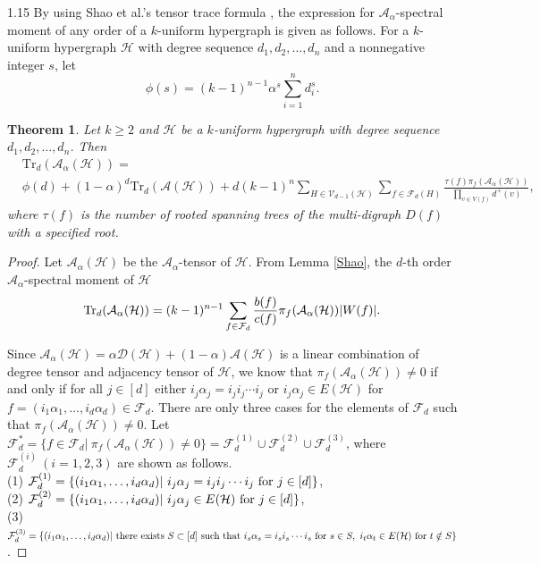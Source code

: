 \documentclass[preprint,12pt]{elsarticle1}
\newtheorem{thm}{Theorem}[section]
\numberwithin{equation}{section}
\begin{document}
\begin{spacing}{1.15}
By using Shao et al.'s tensor trace formula \cite{ref8}, the expression for $\mathcal{A}_{\alpha}$-spectral moment of any order of a $k$-uniform hypergraph is given as follows.
For a $k$-uniform hypergraph $\mathcal{H}$ with degree sequence $d_1,d_2,\ldots,d_n$ and a nonnegative integer $s$, let $$\phi(s)=(k-1)^{n-1}\alpha^{s}\sum_{i=1}^{n}d_{i}^{s}.$$

\begin{thm}\label{T}
Let $k\ge2$ and $\mathcal{H}$ be a $k$-uniform hypergraph with degree sequence $d_1,d_2,\ldots,d_n$.
Then
\begin{equation*}
\begin{aligned}
&\mathrm{Tr}_{d}(\mathcal{A}_{\alpha}(\mathcal{H}))=\\& \phi(d)+(1-\alpha)^{d}\mathrm{Tr}_{d}(\mathcal{A}(\mathcal{H}))+d(k-1)^{n}\sum\limits_{H\in\mathcal{V}_{d-1}(\mathcal{H})}\sum\limits_{f\in\mathcal{F}_{d}(H)}\frac{\tau(f)\pi_{f}(\mathcal{A}_{\alpha}(\mathcal{H}))}{\prod\limits_{v\in V(f)}d^{+}(v)},
\end{aligned}
\end{equation*}
where $\tau(f)$ is the number of rooted spanning trees of the multi-digraph $D(f)$ with a specified root.
\end{thm}

\begin{proof}
Let $\mathcal{A}_{\alpha}(\mathcal{H})$ be the $\mathcal{A}_{\alpha}$-tensor of $\mathcal{H}$. From Lemma \ref{Shao}, the $d$-th order $\mathcal{A}_{\alpha}$-spectral moment of $\mathcal{H}$
$$\textnormal{Tr}_{d}(\mathcal{A}_{\alpha}(\mathcal{H}))=(k-1)^{n-1}\sum_{f\in \mathcal{F}_{d}}\frac{b(f)}{c(f)}\pi_{f}(\mathcal{A}_{\alpha}(\mathcal{H}))|W(f)|.$$

Since $\mathcal{A}_{\alpha}(\mathcal{H})=\alpha\mathcal{D}(\mathcal{H})+(1-\alpha)\mathcal{A}(\mathcal{H})$ is a linear combination of degree tensor and adjacency tensor of $\mathcal{H}$,
we know that  $\pi_f(\mathcal{A}_{\alpha}(\mathcal{H}))\ne0$ if and only if for all $j\in[d]$ either $i_j\alpha_j=i_ji_j\cdots i_j$ or $i_j\alpha_j\in E(\mathcal{H})$ for $f=(i_1\alpha_1,\ldots,i_d\alpha_d)\in\mathcal{F}_{d}$.
There are only three cases for the elements of $\mathcal{F}_d$ such that $\pi_{f}(\mathcal{A}_{\alpha}(\mathcal{H}))\ne0$.
Let $\mathcal{F}_{d}^{*}=\{f\in\mathcal{F}_{d}|\ \pi_{f}(\mathcal{A}_{\alpha}(\mathcal{H}))\ne0\}=\mathcal{F}_{d}^{(1)}\cup\mathcal{F}_{d}^{(2)}\cup\mathcal{F}_{d}^{(3)}$, where $\mathcal{F}_{d}^{(i)}~(i=1,2,3)$ are shown as follows.\\
(1) $\mathcal{F}_{d}^{(1)}=\{(i_{1}\alpha_{1},\ldots,i_{d}\alpha_{d})|\ i_j\alpha_{j}=i_ji_j\cdots i_j\ \textnormal{for}\ j\in[d]\}$,\\
(2) $\mathcal{F}_{d}^{(2)}=\{(i_{1}\alpha_{1},\ldots, i_{d}\alpha_{d})|\ i_j\alpha_j\in E(\mathcal{H})\ \textnormal{for}\ j\in[d]\}$,\\
(3) $\mathcal{F}_{d}^{(3)}=\{(i_{1}\alpha_{1},\ldots,i_{d}\alpha_{d})|\  \textnormal{there exists}\ S\subset[d]\ \textnormal{such that}\ i_s\alpha_s=i_si_s\cdots i_s\ \textnormal{for}\ s\in S,\ i_t\alpha_t\in E(\mathcal{H})\ \textnormal{for}\ t\notin S\}$.


\end{proof}
\end{spacing}
\end{document}
